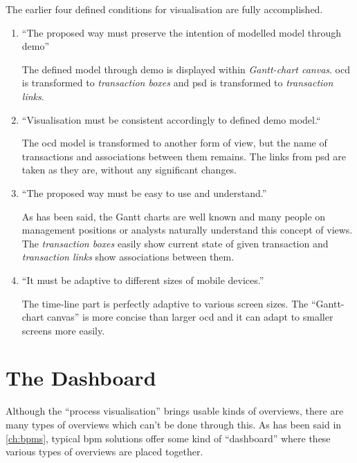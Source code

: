 The earlier four defined conditions for visualisation are fully accomplished.

\begin{enumerate}[i]
    \item \begin{graytext}
    ``The proposed way must preserve the intention of modelled model through \gls{demo}''\end{graytext}
    
    The defined model through \gls{demo} is displayed within \textit{Gantt-chart canvas}. \gls{ocd} is transformed to \textit{transaction boxes} and \gls{psd} is transformed to \textit{transaction links}.
    \item \begin{graytext}``Visualisation must be consistent accordingly to defined \gls{demo} model.`` \end{graytext}
    
    The \gls{ocd} model is transformed to another form of view, but the name of transactions and associations between them remains. The links from \gls{psd} are taken as they are, without any significant changes.
    \item \begin{graytext}``The proposed way must be easy to use and understand.''\end{graytext}
    
    As has been said, the Gantt charts are well known and many people on management positions or analysts naturally understand this concept of views. The \textit{transaction boxes} easily  show current state of given transaction and \textit{transaction links} show associations between them.    
    \item \begin{graytext}``It must be adaptive to different sizes of mobile devices.''\end{graytext}
    
    The time-line part is perfectly adaptive to various screen sizes. The ``Gantt-chart canvas'' is more concise than larger \gls{ocd} and it can adapt to smaller screens more easily.
\end{enumerate}

\section{The Dashboard}
Although the ``process visualisation'' brings usable kinds of overviews, there are many types of overviews which can't be done through this. As has been said in \cref{ch:bpms}, typical \gls{bpm} solutions offer some kind of ``dashboard'' where these various types of overviews are placed together. 

